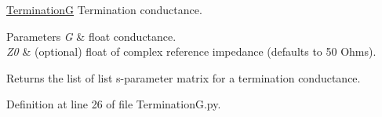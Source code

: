 \hyperlink{namespaceSignalIntegrity_1_1Devices_1_1TerminationG}{TerminationG} Termination conductance. 


\begin{DoxyParams}{Parameters}
{\em G} & float conductance. \\
\hline
{\em Z0} & (optional) float of complex reference impedance (defaults to 50 Ohms). \\
\hline
\end{DoxyParams}
\begin{DoxyReturn}{Returns}
the list of list s-\/parameter matrix for a termination conductance. 
\end{DoxyReturn}


Definition at line 26 of file Termination\+G.\+py.

